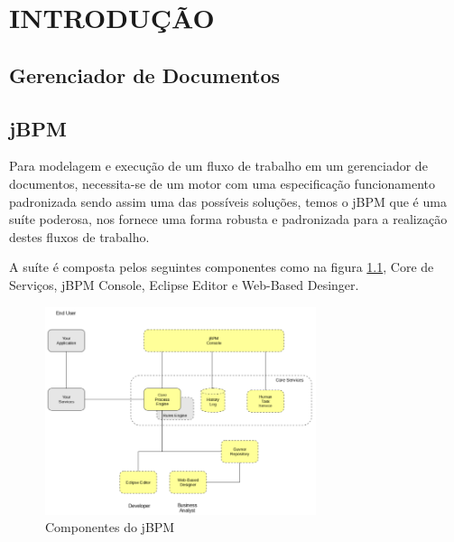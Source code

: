 \documentclass{abnt}
\begin{document}






\capa

\folhaderosto

\tableofcontents


\chapter{INTRODUÇÃO}

	\section{Gerenciador de Documentos}
	
					
	\section{jBPM}
	
		Para modelagem e execução de um fluxo de trabalho em um gerenciador de documentos, necessita-se de um motor com uma
		especificação funcionamento padronizada sendo assim uma das possíveis soluções, temos o jBPM que é uma suíte
		poderosa, nos fornece uma forma robusta e padronizada para a realização destes fluxos de trabalho.
						
		A suíte é composta pelos seguintes componentes como na figura \ref{fig:jbpmOverview}, Core de Serviços, jBPM
		Console, Eclipse Editor e Web-Based Desinger.
		
		
		\begin{figure}[htp]
			\begin{center}
			  \includegraphics[width=300]{jbpm_overview}
			  \caption[labelInTOC]{Componentes do jBPM}
			  \label{fig:jbpmOverview}
			\end{center}
		\end{figure}
		\FloatBarrier
		
\end{document}
